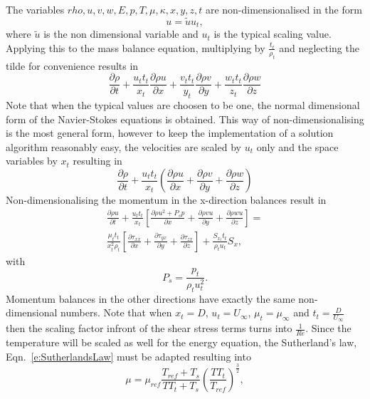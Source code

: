 \documentclass{report}
\newcommand{\dt}[1]{\frac{\partial #1}{\partial t}}
\newcommand{\dx}[1]{\frac{\partial #1}{\partial x}}
\newcommand{\dy}[1]{\frac{\partial #1}{\partial y}}
\newcommand{\dz}[1]{\frac{\partial #1}{\partial z}}
\begin{document}
The variables $rho,u,v,w,E,p,T, \mu, \kappa, x,y,z,t$ are non-dimensionalised in the form
\begin{equation}
\label{e:exampleNonDim}
u = \tilde{u}u_t,
\end{equation}
where $\tilde{u}$ is the non dimensional variable and $u_t$ is the typical scaling value. Applying this to the mass balance equation, multiplying by $\frac{t_t}{\rho_t}$ and neglecting the tilde for convenience results in
\begin{equation}
\label{e:nonDimMassEquation}
\dt{\rho} 
+ \frac{u_t t_t}{x_t}\dx{\rho u}
+ \frac{v_t t_t}{y_t}\dy{\rho v}
+ \frac{w_t t_t}{z_t}\dz{\rho w}
\end{equation}
Note that when the typical values are choosen to be one, the normal dimensional form of the Navier-Stokes equations is obtained. This way of non-dimensionalising is the most general form, however to keep the implementation of a solution algorithm reasonably easy, the velocities are scaled by $u_t$ only and the space variables by $x_t$ resulting in
\begin{equation}
\label{e:nonDimMassEquationEasy}
\dt{\rho} + \frac{u_t t_t}{x_t}
\left(
\dx{\rho u}
+ \dy{\rho v}
+ \dz{\rho w}
\right)
\end{equation}
Non-dimensionalising the momentum in the x-direction balances result in
\begin{equation}
\label{e:momentumBalance_XNonDim}
\begin{array}{c}
\dt{\rho u}
 + \frac{u_t t_t}{x_t}\left [\dx{\rho u^2 + P_sp} + \dy{\rho v u} + \dz{\rho w u} \right] = \\
 \frac{\mu_t t_t}{x_t^2 \rho_t}\left[ \dx{\tau_{xx}} + \dy{\tau_{yx}} + \dz{\tau_{zx}} \right]
 + \frac{S_{x_t} t_t}{\rho_t u_t}S_x,
 \end{array}
\end{equation}
with
\begin{equation}
P_s = \frac{p_t}{\rho_t u_t^2}.
\end{equation}
Momentum balances in the other directions have exactly the same non-dimensional numbers. Note that when $x_t = D$, $u_t = U_{\infty}$, $\mu_t = \mu_{\infty}$ and $t_t = \frac{D}{U_{\infty}}$ then the scaling factor infront of the shear stress terms turns into $\frac{1}{Re}$. Since the temperature will be scaled as well for the energy equation, the Sutherland's law, Eqn.~\ref{e:SutherlandsLaw} must be adapted resulting into
\begin{equation}
\label{e:SutherlandsLawScaled}
\mu = \mu_{ref}  \frac{T_{ref} + T_s}{T T_t + T_s} \left( \frac{T T_t}{T_{ref}} \right)^\frac{3}{2},
\end{equation}
\end{document}
